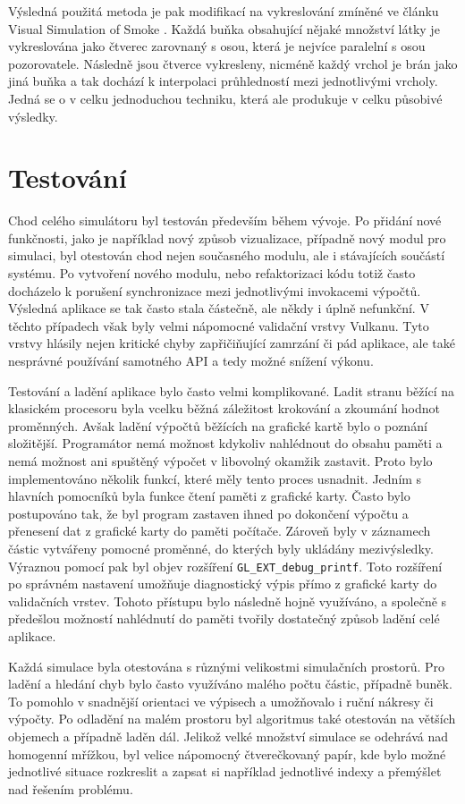 Výsledná použitá metoda je pak modifikací na vykreslování zmíněné ve článku Visual Simulation of Smoke \cite{visualSmoke}. Každá buňka obsahující nějaké množství látky je vykreslována jako čtverec zarovnaný s osou, která je nejvíce paralelní s osou pozorovatele. Následně jsou čtverce vykresleny, nicméně každý vrchol je brán jako jiná buňka a tak dochází k interpolaci průhledností mezi jednotlivými vrcholy. Jedná se o v celku jednoduchou techniku, která ale produkuje v celku působivé výsledky.

\chapter{Testování}
\label{chapter:testovani}
Chod celého simulátoru byl testován především během vývoje. Po přidání nové funkčnosti, jako je například nový způsob vizualizace, případně nový modul pro simulaci, byl otestován chod nejen současného modulu, ale i stávajících součástí systému. Po vytvoření nového modulu, nebo refaktorizaci kódu totiž často docházelo k porušení synchronizace mezi jednotlivými invokacemi výpočtů. Výsledná aplikace se tak často stala částečně, ale někdy i úplně nefunkční. V těchto případech však byly velmi nápomocné validační vrstvy Vulkanu. Tyto vrstvy hlásily nejen kritické chyby zapřičiňující zamrzání či pád aplikace, ale také nesprávné používání samotného API a tedy možné snížení výkonu.

Testování a ladění aplikace bylo často velmi komplikované. Ladit stranu běžící na klasickém procesoru byla vcelku běžná záležitost krokování a zkoumání hodnot proměnných. Avšak ladění výpočtů běžících na grafické kartě bylo o poznání složitější. Programátor nemá možnost kdykoliv nahlédnout do obsahu paměti a nemá možnost ani spuštěný výpočet v libovolný okamžik zastavit. Proto bylo implementováno několik funkcí, které měly tento proces usnadnit. Jedním s hlavních pomocníků byla funkce čtení paměti z grafické karty. Často bylo postupováno tak, že byl program zastaven ihned po dokončení výpočtu a přenesení dat z grafické karty do paměti počítače. Zároveň byly v záznamech částic vytvářeny pomocné proměnné, do kterých byly ukládány mezivýsledky. Výraznou pomocí pak byl objev rozšíření \texttt{GL\_EXT\_debug\_printf}. Toto rozšíření po správném nastavení umožňuje diagnostický výpis přímo z grafické karty do validačních vrstev. Tohoto přístupu bylo následně hojně využíváno, a společně s předešlou možností nahlédnutí do paměti tvořily dostatečný způsob ladění celé aplikace.

Každá simulace byla otestována s různými velikostmi simulačních prostorů. Pro ladění a hledání chyb bylo často využíváno malého počtu částic, případně buněk. To pomohlo v snadnější orientaci ve výpisech a umožňovalo i ruční nákresy či výpočty. Po odladění na malém prostoru byl algoritmus také otestován na větších objemech a případně laděn dál. Jelikož velké množství simulace se odehrává nad homogenní mřížkou, byl velice nápomocný čtverečkovaný papír, kde bylo možné jednotlivé situace rozkreslit a zapsat si například jednotlivé indexy a přemýšlet nad řešením problému.

